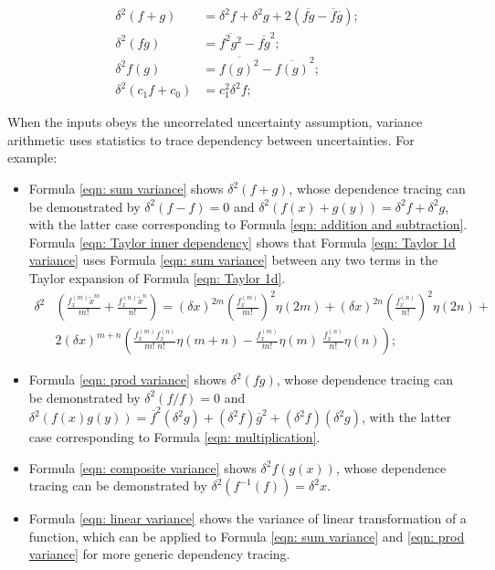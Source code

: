 \documentclass[twoside]{article}
\numberwithin{equation}{section}
\begin{document}
\fi

\begin{align}
\label{eqn: sum variance}
\delta^2 (f + g) &= \delta^2 f + \delta^2 g + 2 (\overline{fg} - \overline{f}\overline{g}); \\
\label{eqn: prod variance}
\delta^2 (f g) &= \overline{f^2 g^2} - \overline{f g}^2; \\
\label{eqn: composite variance}
\delta^2 f(g) &= \overline{f(g)^2} - \overline{f(g)}^2; \\
\label{eqn: linear variance}
\delta^2 (c_1 f + c_0) &= c_1^2 \delta^2f; 
\end{align}

When the inputs obeys the uncorrelated uncertainty assumption, variance arithmetic uses statistics to trace dependency between uncertainties.
For example:
\begin{itemize}
\item Formula \eqref{eqn: sum variance} shows $\delta^2 (f + g)$, whose dependence tracing can be demonstrated by $\delta^2 (f - f) = 0$  and $\delta^2 (f(x) + g(y)) = \delta^2 f + \delta^2 g$, with the latter case corresponding to Formula \eqref{eqn: addition and subtraction}.   
Formula \eqref{eqn: Taylor inner dependency} shows that Formula \eqref{eqn: Taylor 1d variance} uses Formula \eqref{eqn: sum variance} between any two terms in the Taylor expansion of Formula \eqref{eqn: Taylor 1d}.
\begin{align}
\label{eqn: Taylor inner dependency}
\delta^2 & \left( \frac{f^{(m)}_x \tilde{x}^m}{m!} + \frac{f^{(n)}_x \tilde{x}^n}{n!} \right) = 
    (\delta x)^{2m} (\frac{f^{(m)}_x }{m!})^2 \eta(2m) + (\delta x)^{2n} (\frac{f^{(n)}_x }{n!})^2 \eta(2n) + \nonumber \\
  & 2 (\delta x)^{m+n} \left( \frac{f^{(m)}_x f^{(n)}_x}{m! \;n!} \eta(m+n) 	- \frac{f^{(m)}_x}{m!} \eta(m) \;\frac{f^{(n)}_x}{n!}  \eta(n) \right);
\end{align}


\item Formula \eqref{eqn: prod variance} shows  $\delta^2 (f g)$, whose dependence tracing can be demonstrated by $\delta^2 (f/f) = 0$  and $\delta^2 (f(x) g(y)) = \overline{f}^2 (\delta^2 g) + (\delta^2 f) \overline{g}^2 +  (\delta^2 f) (\delta^2 g)$, with the latter case corresponding to Formula \eqref{eqn: multiplication}.  

\item Formula \eqref{eqn: composite variance} shows  $\delta^2 f(g(x))$, whose dependence tracing can be demonstrated by $\delta^2 (f^{-1}(f)) = \delta^2 x$.  

\item Formula \eqref{eqn: linear variance} shows the variance of linear transformation of a function, which can be applied to Formula \eqref{eqn: sum variance} and \eqref{eqn: prod variance} for more generic dependency tracing.
\end{itemize}
\end{document}
